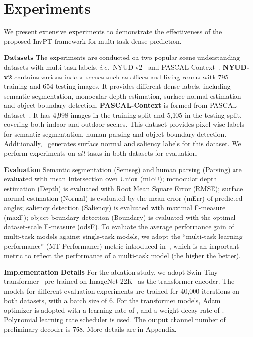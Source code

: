 \documentclass[runningheads]{llncs}
\newcommand*{\ie}{\emph{i.e.}}
\begin{document}
\section{Experiments}
\vspace{-6pt}
We present extensive experiments to demonstrate the effectiveness of the proposed InvPT framework for multi-task dense prediction.
\vspace{3pt}
\par\noindent\textbf{Datasets} The experiments are conducted on two popular scene understanding datasets with multi-task labels, \ie~NYUD-v2~\cite{silberman2012indoor} and PASCAL-Context~\cite{chen2014detect}.
\textbf{NYUD-v2} contains various indoor scenes such as offices and living rooms with 795 training and 654 testing images. It provides different dense labels, including semantic segmentation, monocular depth estimation, surface normal estimation  and object boundary detection.
\textbf{PASCAL-Context} is formed from PASCAL dataset~\cite{everingham2010pascal}. It has 4,998 images in the training split and 5,105 in the testing split, covering both indoor and outdoor scenes. This dataset provides pixel-wise labels for semantic segmentation, human parsing and object boundary detection. Additionally,~\cite{astmt} generates surface normal and saliency labels for this dataset.
We perform experiments on \emph{all} tasks in both datasets for evaluation.

\vspace{3pt}
\par\noindent\textbf{Evaluation}
Semantic segmentation (Semseg) and human parsing (Parsing) are evaluated with mean Intersection over Union (mIoU); monocular depth estimation (Depth) is evaluated with Root Mean Square Error (RMSE);
surface normal estimation (Normal) is evaluated by the mean error (mErr) of predicted angles; saliency detection (Saliency) is evaluated with maximal F-measure (maxF); object boundary detection (Boundary) is evaluated with the optimal-dataset-scale F-measure (odsF). To evaluate the average performance gain of multi-task models against single-task models, we adopt the ``multi-task learning performance'' (MT Performance) metric  introduced in~\cite{astmt}, which is an important metric to reflect the performance of a multi-task model (the higher the better).

\vspace{3pt}
\par\noindent\textbf{Implementation Details}
For the ablation study, we adopt Swin-Tiny transformer~\cite{swin} pre-trained on ImageNet-22K~\cite{deng2009imagenet} as the transformer encoder. The models for different evaluation experiments are trained for 40,000 iterations on both datasets, with a batch size of 6. For the transformer models, Adam optimizer is adopted with a learning rate of , and a weight decay rate of . Polynomial learning rate scheduler is used.
The output channel number of preliminary decoder is 768. More details are in Appendix.
\end{document}
